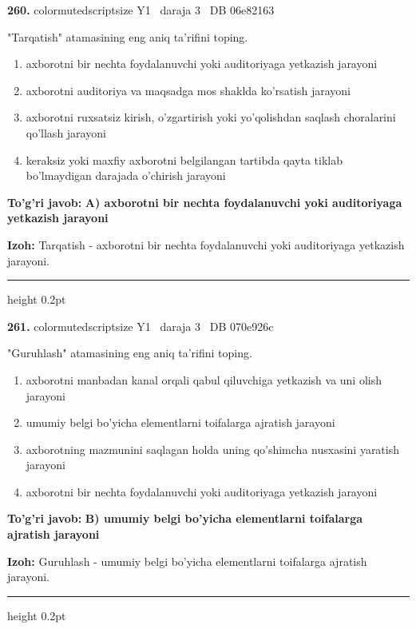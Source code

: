 \documentclass[10pt,a4paper,oneside]{article}
\begin{document}
\noindent\textbf{\color{ink}260.}  {color{muted}scriptsize Y1 \textbullet\ daraja 3 \textbullet\ DB 06e82163}
\par
"Tarqatish" atamasining eng aniq ta'rifini toping.
\begin{enumerate}[label=\Alph*),leftmargin=9mm]
\item axborotni bir nechta foydalanuvchi yoki auditoriyaga yetkazish jarayoni
\item axborotni auditoriya va maqsadga mos shaklda ko'rsatish jarayoni
\item axborotni ruxsatsiz kirish, o'zgartirish yoki yo'qolishdan saqlash choralarini qo'llash jarayoni
\item keraksiz yoki maxfiy axborotni belgilangan tartibda qayta tiklab bo'lmaydigan darajada o'chirish jarayoni
\end{enumerate}
\begin{tcolorbox}[enhanced,breakable,colback=teal!4,colframe=teal!50!black,boxrule=0.5pt,arc=1.1mm,left=3mm,right=3mm,top=1.7mm,bottom=1.7mm,before skip=2mm,after skip=2mm]
\textbf{\color{teal}To'g'ri javob:} \textbf{A) axborotni bir nechta foydalanuvchi yoki auditoriyaga yetkazish jarayoni}
\par\smallskip
\textbf{Izoh:} Tarqatish - axborotni bir nechta foydalanuvchi yoki auditoriyaga yetkazish jarayoni.
\end{tcolorbox}
\vspace{2mm}\hrule height 0.2pt \vspace{3mm}

\noindent\textbf{\color{ink}261.}  {color{muted}scriptsize Y1 \textbullet\ daraja 3 \textbullet\ DB 070e926c}
\par
"Guruhlash" atamasining eng aniq ta'rifini toping.
\begin{enumerate}[label=\Alph*),leftmargin=9mm]
\item axborotni manbadan kanal orqali qabul qiluvchiga yetkazish va uni olish jarayoni
\item umumiy belgi bo'yicha elementlarni toifalarga ajratish jarayoni
\item axborotning mazmunini saqlagan holda uning qo'shimcha nusxasini yaratish jarayoni
\item axborotni bir nechta foydalanuvchi yoki auditoriyaga yetkazish jarayoni
\end{enumerate}
\begin{tcolorbox}[enhanced,breakable,colback=teal!4,colframe=teal!50!black,boxrule=0.5pt,arc=1.1mm,left=3mm,right=3mm,top=1.7mm,bottom=1.7mm,before skip=2mm,after skip=2mm]
\textbf{\color{teal}To'g'ri javob:} \textbf{B) umumiy belgi bo'yicha elementlarni toifalarga ajratish jarayoni}
\par\smallskip
\textbf{Izoh:} Guruhlash - umumiy belgi bo'yicha elementlarni toifalarga ajratish jarayoni.
\end{tcolorbox}
\vspace{2mm}\hrule height 0.2pt \vspace{3mm}
\end{document}
